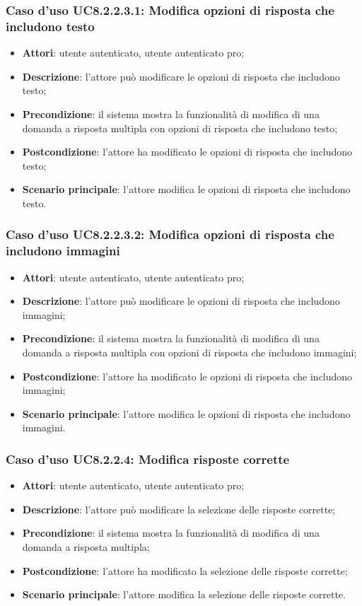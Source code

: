 \subsubsection{Caso d'uso UC8.2.2.3.1: Modifica opzioni di risposta che includono testo}
	\begin{itemize}
		\item
			\textbf{Attori}: utente autenticato, utente autenticato pro;
		\item		
			\textbf{Descrizione}: l'attore può modificare le opzioni di risposta che includono testo;
		\item
			\textbf{Precondizione}: il sistema mostra la funzionalità di modifica di una domanda a risposta multipla con opzioni di risposta che includono testo; 
		\item
			\textbf{Postcondizione}: l'attore ha modificato le opzioni di risposta che includono testo;
		\item
			\textbf{Scenario principale}: l'attore modifica le opzioni di risposta che includono testo. 			
	\end{itemize}	
	
\subsubsection{Caso d'uso UC8.2.2.3.2: Modifica opzioni di risposta che includono immagini}
	\begin{itemize}
		\item
			\textbf{Attori}: utente autenticato, utente autenticato pro;
		\item		
			\textbf{Descrizione}: l'attore può modificare le opzioni di risposta che includono immagini;
		\item
			\textbf{Precondizione}: il sistema mostra la funzionalità di modifica di una domanda a risposta multipla con opzioni di risposta che includono immagini; 
		\item
			\textbf{Postcondizione}: l'attore ha modificato le opzioni di risposta che includono immagini;
		\item
			\textbf{Scenario principale}: l'attore modifica le opzioni di risposta che includono immagini. 			
	\end{itemize}
	
\subsubsection{Caso d'uso UC8.2.2.4: Modifica risposte corrette}
	\begin{itemize}
		\item
			\textbf{Attori}: utente autenticato, utente autenticato pro;
		\item		
			\textbf{Descrizione}: l'attore può modificare la selezione delle risposte corrette;
		\item
			\textbf{Precondizione}: il sistema mostra la funzionalità di modifica di una domanda a risposta multipla;
		\item
			\textbf{Postcondizione}: l'attore ha modificato la selezione delle risposte corrette;
		\item
			\textbf{Scenario principale}: l'attore modifica la selezione delle risposte corrette. 			
	\end{itemize}
